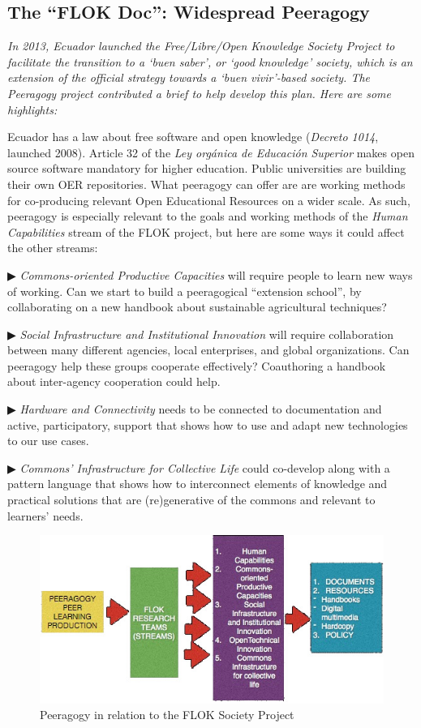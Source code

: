 \begin{mdframed}
\subsection{The ``FLOK Doc'': Widespread Peeragogy}
\noindent \emph{In 2013, Ecuador launched the Free/Libre/Open Knowledge Society Project to facilitate the transition to a ‘\emph{buen saber}’, or ‘good knowledge’ society, which is an extension of the official strategy towards a ‘\emph{buen vivir}’-based society.  The Peeragogy project contributed a brief to help develop this plan.  Here are some highlights:}

Ecuador has a law about free software and open knowledge (\emph{Decreto 1014}, launched 2008). Article 32 of the \emph{Ley orgánica de Educación Superior} makes open source software mandatory for higher education. Public universities are building their own  OER repositories. What peeragogy can offer are are working methods for co-producing relevant Open Educational Resources on a wider scale.  As such, peeragogy is especially relevant to the goals and working methods of the \emph{Human Capabilities} stream of the FLOK project, but here are some ways it could affect the other streams:

▶ \emph{Commons-oriented Productive Capacities} will require people to learn new ways of working. Can we start to build a peeragogical “extension school”, by collaborating on a new handbook about sustainable agricultural techniques?

▶ \emph{Social Infrastructure and Institutional Innovation} will require collaboration between many different agencies, local enterprises, and global organizations. Can peeragogy help these groups cooperate effectively?  Coauthoring a handbook about inter-agency cooperation could help.

▶ \emph{Hardware and Connectivity} needs to be connected to documentation and active, participatory, support that shows how to use and adapt new technologies to our use cases. 

▶ \emph{Commons’ Infrastructure for Collective Life} could co-develop along with a pattern language that shows how to interconnect elements of knowledge and practical solutions that are (re)generative of the commons and relevant to learners' needs. 
\end{mdframed}

\begin{figure}
\includegraphics[width=\textwidth]{../pictures/flok1.jpg}
\caption*{Peeragogy in relation to the FLOK Society Project}
\end{figure}

